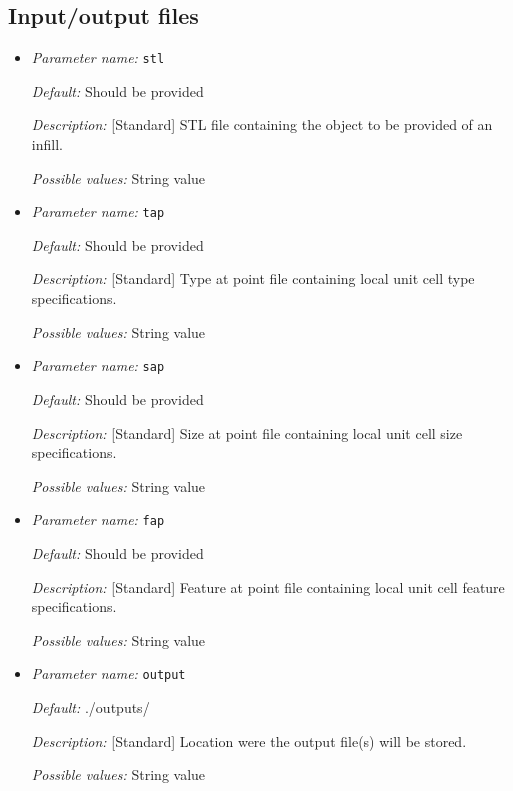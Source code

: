 \subsection{Input/output files} \label{parameters:files}
\begin{itemize}
	\item {\it Parameter name:} {\tt stl}
	\label{parameters:stl}
	
	
	{\it Default:} Should be provided
	
	{\it Description:} [Standard] STL file containing the object to be provided of an infill.
	
	{\it Possible values:} String value
	
	\item {\it Parameter name:} {\tt tap}
	\label{parameters:tap}
	
	
	{\it Default:} Should be provided
	
	{\it Description:} [Standard] Type at point file containing local unit cell type specifications.
	
	{\it Possible values:} String value
	
	\item {\it Parameter name:} {\tt sap}
	\label{parameters:sap}
	
	
	{\it Default:} Should be provided
	
	{\it Description:} [Standard] Size at point file containing local unit cell size specifications.
	
	{\it Possible values:} String value
	
	\item {\it Parameter name:} {\tt fap}
	\label{parameters:fap}
	
	
	{\it Default:} Should be provided
	
	{\it Description:} [Standard] Feature at point file containing local unit cell feature specifications.
	
	{\it Possible values:} String value
	
	\item {\it Parameter name:} {\tt output}
	\label{parameters:output}
	
	
	{\it Default:} ./outputs/
	
	{\it Description:} [Standard] Location were the output file(s) will be stored.
	
	{\it Possible values:} String value
\end{itemize}

